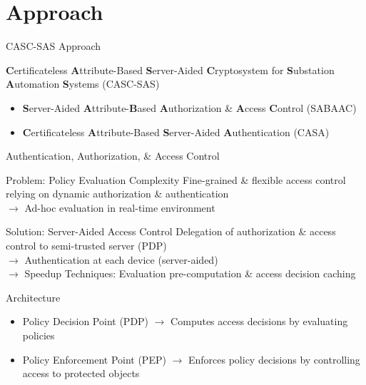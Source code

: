 \documentclass[en]{sdqbeamer}
\begin{document}
\section{Approach}
\begin{frame}{CASC-SAS Approach}
    \begin{greenblock}{\textbf{C}ertificateless \textbf{A}ttribute-Based \textbf{S}erver-Aided \textbf{C}ryptosystem for \textbf{S}ubstation \textbf{A}utomation \textbf{S}ystems (CASC-SAS)}
        \begin{itemize}
            \item \textbf{S}erver-Aided \textbf{A}ttribute-\textbf{B}ased \textbf{A}uthorization \& \textbf{A}ccess \textbf{C}ontrol (SABAAC)
            \item \textbf{C}ertificateless \textbf{A}ttribute-Based \textbf{S}erver-Aided \textbf{A}uthentication (CASA)
        \end{itemize}
    \end{greenblock}
\end{frame}
\begin{frame}{Authentication, Authorization, \& Access Control}
    \begin{redblock}{Problem: Policy Evaluation Complexity}
        Fine-grained \& flexible access control relying on dynamic authorization \& authentication
        \\$\rightarrow$ Ad-hoc evaluation in real-time environment
    \end{redblock}

    \begin{greenblock}{Solution: Server-Aided Access Control}
        Delegation of authorization \& access control to semi-trusted server (PDP)
        \\$\rightarrow$ Authentication at each device (server-aided)
        \\$\rightarrow$ Speedup Techniques: Evaluation pre-computation \& access decision caching
    \end{greenblock}

    \begin{grayblock}{Architecture \parencite{Hu2014,Oasis2013}}
        \begin{itemize}
            \item Policy Decision Point (PDP) $\rightarrow$ Computes access decisions by evaluating policies
            \item Policy Enforcement Point (PEP) $\rightarrow$ Enforces policy decisions by controlling access to protected objects
        \end{itemize}
    \end{grayblock}
\end{frame}
\end{document}
